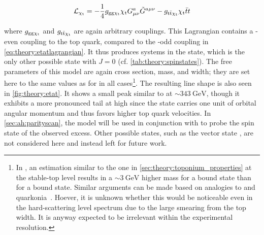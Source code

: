\begin{equation}
  \mathcal{L}_{\mathrm{\chi_t}} = - \frac{1}{4} g_{\mathrm{gg} \mathrm{\chi_t}} \mathrm{\chi_t} G^{a}_{\mu \nu} \tilde{G}^{a \mu \nu} - g_{\mathrm{t \bar{t}} \mathrm{\chi_t}} \mathrm{\chi_t} \bar{t} t
\end{equation}

\noindent where $g_{\mathrm{gg} \mathrm{\chi_t}}$ and $g_{\mathrm{t \bar{t}} \mathrm{\chi_t}}$ are again arbitrary couplings. This Lagrangian contains a \CP-even coupling to the top quark, compared to the \CP-odd coupling in \cref{eq:theory:etatlagrangian}. It thus produces \ttbar systems in the  state, which is the only other possible state with $J = 0$ (cf. \cref{tab:theory:spinstates}). The free parameters of this model are again cross section, mass, and width; they are set here to the same values as for \etat in all cases\footnote{In , an estimation similar to the one in \cref{sec:theory:toponium_properties} at the stable-top level results in a $\sim\SI{3}{\GeV}$ higher mass for a  bound state than for a  bound state. Similar arguments can be made based on analogies to \ccbar and \bbbar quarkonia~\cite{Barnes:2005pb}. Hoever, it is unknown whether this would be noticeable even in the hard-scattering level spectrum due to the large smearing from the top width. It is anyway expected to be irrelevant within the experimental resolution.}. 
The resulting \mWWbb line shape is also seen in \cref{fig:theory:etat}. It shows a small peak similar to \etat at $\sim \SI{343}{\GeV}$, though it exhibits a more pronounced tail at high \mWWbb since the  state carries one unit of orbital angular momentum and thus favors higher top quark velocities. In \cref{sec:ah:parityscan}, the \chit model will be used in conjunction with \etat to probe the spin state of the observed excess. Other possible states, such as the vector state , are not considered here and instead left for future work.




